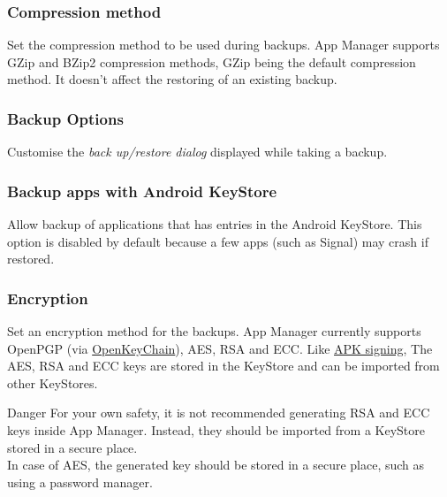 \subsubsection{Compression method} %
Set the compression method to be used during backups. App Manager supports GZip and BZip2 compression methods,
GZip being the default compression method. It doesn't affect the restoring of an existing backup.

\subsubsection{Backup Options}\label{subsubsec:settings-backup-options} %
Customise the \textit{back up/restore dialog} displayed while taking a backup.


\subsubsection{Backup apps with Android KeyStore} %
Allow backup of applications that has entries in the Android KeyStore. This option is disabled by default because
a few apps (such as Signal) may crash if restored.

\subsubsection{Encryption}\label{subsubsec:settings-encryption} %
Set an encryption method for the backups. App Manager currently supports OpenPGP (via
\href{https://f-droid.org/packages/org.sufficientlysecure.keychain/}{OpenKeyChain}), AES, RSA and ECC\@.
Like \hyperref[subsec:apk-signing]{APK signing}, The AES, RSA and ECC keys are stored in the KeyStore and can be
imported from other KeyStores.

\begin{danger}{Danger}
    For your own safety, it is not recommended generating RSA and ECC keys inside App Manager. Instead, they should be
    imported from a KeyStore stored in a secure place.\\
    In case of AES, the generated key should be stored in a secure place, such as using a password manager.
\end{danger}

